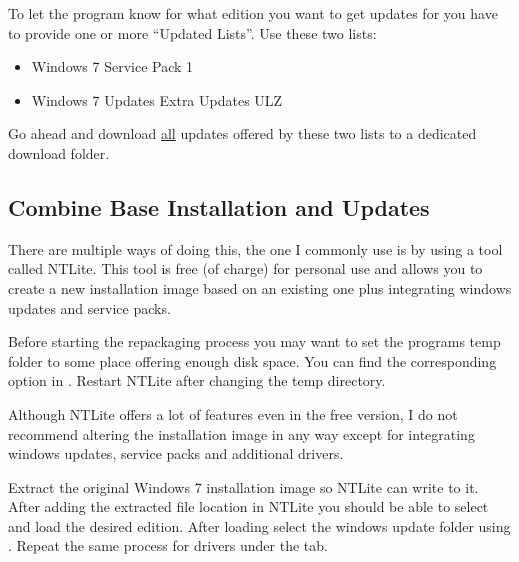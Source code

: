 \documentclass{itsarticle}
\begin{document}

To let the program know for what edition you want to get updates for you have
to provide one or more ``Updated Lists''. Use these two lists:

\begin{itemize}
    \item Windows 7 Service Pack 1\footnotemark
    \item Windows 7 Updates Extra Updates ULZ\footnotemark
\end{itemize}


Go ahead and download \underline{all} updates offered by these two lists to a
dedicated download folder.

\subsection{Combine Base Installation and Updates}
\label{sub:ntlite}

There are multiple ways of doing this, the one I commonly use is by using a
tool called NTLite\footnotemark. This tool is free (of charge) for personal use
and allows you to create a new installation image based on an existing one plus
integrating windows updates and service packs.


Before starting the repackaging process you may want to set the programs temp
folder to some place offering enough disk space. You can find the corresponding
option in . Restart NTLite
after changing the temp directory.

Although NTLite offers a lot of features even in the free version, I do not
recommend altering the installation image in any way except for integrating
windows updates, service packs and additional drivers.

Extract the original Windows 7 installation image so NTLite can write to it.
After adding the extracted file location in NTLite you should be able to select
and load the desired edition. After loading select the windows update folder
using . Repeat the same process for drivers under the  tab.
\end{document}
